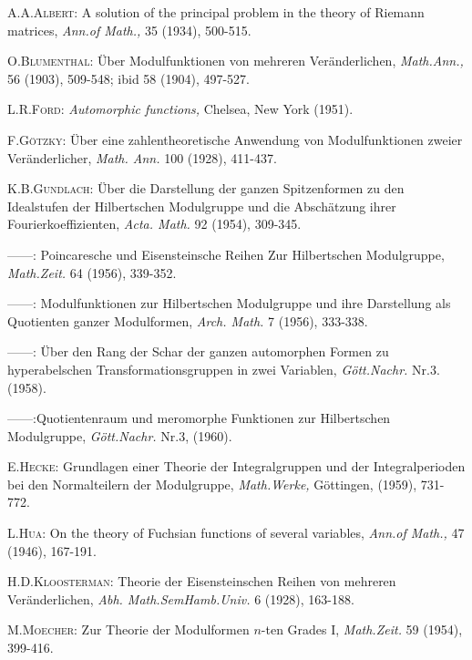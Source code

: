 \begin{thebibliography}{99}
 \textsc{A.\@ A.\@ Albert:} A solution of the principal
  problem in the theory of Riemann matrices, {\em Ann.\@ of Math.,} 35
  (1934), 500-515.

 \textsc{O.\@ Blumenthal:} \"Uber Modulfunktionen von
  mehreren Ver\"anderlichen, {\em Math.\@ Ann.,} 56 (1903), 509-548;
  ibid 58 (1904), 497-527.

 \textsc{L.\@ R.\@ Ford:} {\em Automorphic functions,}
  Chelsea, New York (1951).

 \textsc{F.\@ G\"otzky:} \"Uber eine zahlentheoretische
  Anwendung von Modulfunktionen zweier Ver\"anderlicher, {\em Math.\@
    Ann.} 100 (1928), 411-437.

 \textsc{K.\@ B.\@ Gundlach:} \"Uber die Darstellung der
  ganzen Spitzenformen zu den Idealstufen der Hilbertschen Modulgruppe
  und die Absch\"atzung ihrer Fourierkoeffizienten, {\em Acta.\@
    Math.} 92 (1954), 309-345.

 ------: Poincaresche und Eisensteinsche Reihen Zur
  Hilbertschen Modulgruppe, {\em Math.\@ Zeit.} 64 (1956), 339-352.

 ------: Modulfunktionen zur Hilbertschen Modulgruppe und
  ihre Darstellung als Quotienten ganzer Modulformen, {\em Arch.\@
    Math.} 7 (1956), 333-338.

 ------: \"Uber den Rang der Schar der ganzen automorphen
  Formen zu hyperabelschen Transformationsgruppen in zwei Variablen,
  {\em G\"ott.\@ Nachr.} Nr.\@ 3. (1958).

 ------:\pageoriginale Quotientenraum und meromorphe Funktionen zur
  Hilbertschen Modulgruppe, {\em G\"ott.\@ Nachr.\@} Nr.\@ 3, (1960).

 \textsc{E.\@ Hecke:} Grundlagen einer Theorie der
  Integralgruppen und der Integralperioden bei den Normalteilern der
  Modulgruppe, {\em Math.\@ Werke,} G\"ottingen, (1959), 731-772.

 \textsc{L.\@ Hua:} On the theory of Fuchsian functions of
  several variables, {\em Ann.\@ of Math.,} 47 (1946), 167-191.

 \textsc{H.\@ D.\@ Kloosterman:} Theorie der
  Eisensteinschen Reihen von mehreren Ver\"anderlichen, {\em Abh.\@
    Math.\@ Sem\@ Hamb.\@ Univ.} 6 (1928), 163-188.

 \textsc{M.\@ Moecher:} Zur Theorie der Modulformen
  $n$-ten Grades I, {\em Math.\@ Zeit.} 59 (1954), 399-416.


\end{thebibliography}
